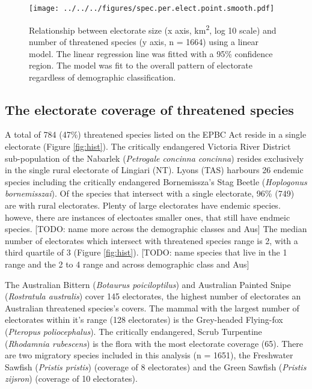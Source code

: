 \documentclass[a4paper,11pt]{article}
\begin{document}
\begin{figure}[H]
	\centering
    \texttt{[image: ../../../figures/spec.per.elect.point.smooth.pdf]}
    \caption{Relationship between electorate size (x axis, km\textsuperscript{2}, log 10 scale) and number of threatened species (y axis, n = 1664) using a linear model. The linear regression line was fitted with a 95\% confidence region. The model was fit to the overall pattern of electorate regardless of demographic classification.}
    \label{fig:point_smooth}
\end{figure}

\subsection{The electorate coverage of threatened species}

A total of 784 (47\%) threatened species listed on the EPBC Act reside in a single electorate (Figure \ref{fig:hist}).
The critically endangered Victoria River District sub-population of the Nabarlek (\emph{Petrogale concinna concinna}) resides exclusively in the single rural electorate of Lingiari (NT). Lyons (TAS) harbours 26 endemic species including the critically endangered Bornemissza's Stag Beetle (\emph{Hoplogonus bornemisszai}).
Of the species that intersect with a single electorate, 96\% (749) are with rural electorates.
Plenty of large electorates have endemic species. howeve, there are instances of electoates smaller ones, that still have endmeic species.
[TODO: name more across the demographic classes and Aus]
The median number of electorates which intersect with threatened species range is 2, with a third quartile of 3 (Figure \ref{fig:hist}).
[TODO: name species that live in the 1 range and the 2 to 4 range and across demographic class and Aus]

The Australian Bittern (\emph{Botaurus poiciloptilus}) and Australian Painted Snipe (\emph{Rostratula australis}) cover 145 electorates, the highest number of electorates an Australian threatened species's covers. The mammal with the largest number of electorates within it's range (128 electorates) is the Grey-headed Flying-fox (\emph{Pteropus poliocephalus}). The critically endangered, Scrub Turpentine (\emph{Rhodamnia rubescens}) is the flora with the most electorate coverage (65).
There are two migratory species included in this analysis (n = 1651), the Freshwater Sawfish (\emph{Pristis pristis}) (coverage of 8 electorates) and the Green Sawfish (\emph{Pristis zijsron}) (coverage of 10 electorates).
\end{document}
